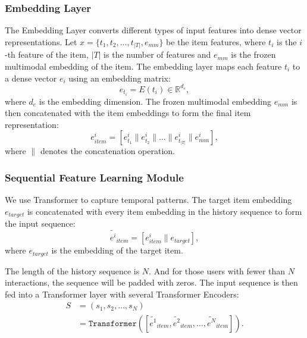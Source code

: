 \documentclass[sigconf, nonacm, screen]{acmart}
\begin{document}
\subsubsection{Embedding Layer}
The Embedding Layer converts different types of input features into dense vector representations.
Let \(x=\{t_1, t_2,\ldots,t_{|T|},e_{mm}\}\) be the item features, where \(t_i\) is the \(i\)-th feature of the item, \(|T|\) is the number of features and \(e_{mm}\) is the frozen multimodal embedding of the item.
The embedding layer maps each feature \(t_i\) to a dense vector \(e_i\) using an embedding matrix:
\begin{equation}
  e_{t_i} = E(t_i) \in \mathbb{R}^{d_e},
\end{equation}
where \(d_e\) is the embedding dimension.
The frozen multimodal embedding \(e_{mm}\) is then concatenated with the item embeddings to form the final item representation:
\begin{equation}
  e^i_{item} = \left[e^i_{t_1} \parallel e^i_{t_2} \parallel \ldots \parallel e^i_{t_{|T|}} \parallel e^i_{mm}\right],
\end{equation}
where \(\parallel\) denotes the concatenation operation.

\subsubsection{Sequential Feature Learning Module}
We use Transformer to capture temporal patterns.
The target item embedding \(e_{target}\) is concatenated with every item embedding in the history sequence to form the input sequence:
\begin{equation}
  \widetilde{e^i}_{item} =\left[e^i_{item} \parallel e_{target}\right],
\end{equation}
where \(e_{target}\) is the embedding of the target item.

The length of the history sequence is \(N\). And for those users with fewer than \(N\) interactions, the sequence will be padded with zeros.
The input sequence is then fed into a Transformer layer with several Transformer Encoders:
\begin{equation}
  \begin{aligned}
    S & = \left(s_1,s_2,\ldots,s_N\right) \\ & = \texttt{Transformer}\left(\left[\widetilde{e^1}_{item},\widetilde{e^2}_{item},\ldots,\widetilde{e^N}_{item}\right]\right).
  \end{aligned}
\end{equation}
\end{document}
